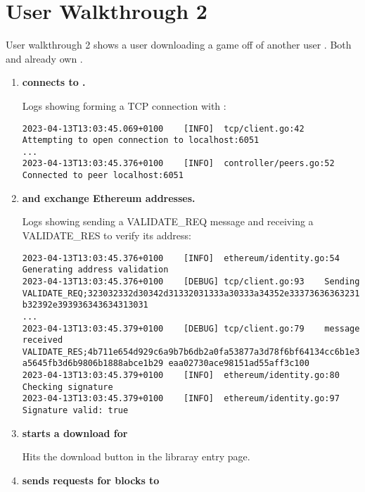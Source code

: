 
\section*{User Walkthrough 2}

User walkthrough 2 shows a user  downloading a game  off of another user . Both  and  already own .

\begin{enumerate}[itemsep=2.5pt]
  \item \textbf{ connects to .}
  
  Logs showing  forming a TCP connection with : 
\begin{lstlisting}[breaklines=true, postbreak=\mbox{\textcolor{red}{$\hookrightarrow$}\space}]
2023-04-13T13:03:45.069+0100	[INFO]	tcp/client.go:42	Attempting to open connection to localhost:6051
...
2023-04-13T13:03:45.376+0100	[INFO]	controller/peers.go:52	Connected to peer localhost:6051
\end{lstlisting}

  \item \textbf{ and  exchange Ethereum addresses.}
  
  Logs showing  sending  a VALIDATE\_REQ message and receiving a VALIDATE\_RES to verify its address: 
\begin{lstlisting}[breaklines=true, postbreak=\mbox{\textcolor{red}{$\hookrightarrow$}\space}]
2023-04-13T13:03:45.376+0100	[INFO]	ethereum/identity.go:54	Generating address validation
2023-04-13T13:03:45.376+0100	[DEBUG]	tcp/client.go:93	Sending VALIDATE_REQ;323032332d30342d31332031333a30333a34352e33373636363231202b3031303020425354206d3d2 b32392e393936343634313031
...
2023-04-13T13:03:45.379+0100	[DEBUG]	tcp/client.go:79	message received VALIDATE_RES;4b711e654d929c6a9b7b6db2a0fa53877a3d78f6bf64134cc6b1e35f2ff029682fbb484d74 a5645fb3d6b9806b1888abce1b29 eaa02730ace98151ad55aff3c100
2023-04-13T13:03:45.379+0100	[INFO]	ethereum/identity.go:80	Checking signature
2023-04-13T13:03:45.379+0100	[INFO]	ethereum/identity.go:97	Signature valid: true
\end{lstlisting}

  \item \textbf{ starts a download for }
  
   Hits the download button in the libraray entry page.

  \item \textbf{ sends requests for blocks to }
  

\end{enumerate}
